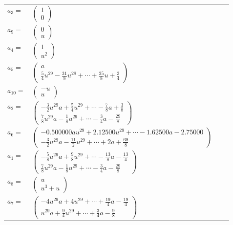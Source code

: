 \documentclass[1p]{elsarticle_modified}
\theoremstyle{definition}
\begin{document}
\begin{tabular}{m{7pt} m{180pt} m{7pt} m{180pt} }
\flushright $a_{3}=$&$\begin{pmatrix}1\\0\end{pmatrix}$ \\
\flushright $a_{9}=$&$\begin{pmatrix}0\\u\end{pmatrix}$ \\
\flushright $a_{4}=$&$\begin{pmatrix}1\\u^2\end{pmatrix}$ \\
\flushright $a_{5}=$&$\begin{pmatrix}a\\\frac{5}{4} u^{29}-\frac{31}{8} u^{28}+\cdots+\frac{25}{8} u+\frac{3}{4}\end{pmatrix}$ \\
\flushright $a_{10}=$&$\begin{pmatrix}- u\\u\end{pmatrix}$ \\
\flushright $a_{2}=$&$\begin{pmatrix}-\frac{3}{2} u^{29} a+\frac{5}{4} u^{29}+\cdots-\frac{7}{8} a+\frac{3}{8}\\\frac{7}{8} u^{29} a-\frac{1}{8} u^{29}+\cdots-\frac{3}{4} a-\frac{29}{8}\end{pmatrix}$ \\
\flushright $a_{6}=$&$\begin{pmatrix}-0.500000 a u^{29}+2.12500 u^{29}+\cdots-1.62500 a-2.75000\\-\frac{3}{2} u^{29} a-\frac{11}{2} u^{29}+\cdots+2 a+\frac{69}{8}\end{pmatrix}$ \\
\flushright $a_{1}=$&$\begin{pmatrix}-\frac{5}{8} u^{29} a+\frac{9}{8} u^{29}+\cdots-\frac{13}{8} a-\frac{13}{4}\\\frac{7}{8} u^{29} a-\frac{1}{8} u^{29}+\cdots-\frac{3}{4} a-\frac{29}{8}\end{pmatrix}$ \\
\flushright $a_{8}=$&$\begin{pmatrix}u\\u^3+u\end{pmatrix}$ \\
\flushright $a_{7}=$&$\begin{pmatrix}-4 u^{29} a+4 u^{29}+\cdots+\frac{19}{4} a-\frac{19}{4}\\u^{29} a+\frac{9}{4} u^{29}+\cdots+\frac{3}{4} a-\frac{9}{8}\end{pmatrix}$ \\

\end{tabular}
\end{document}
